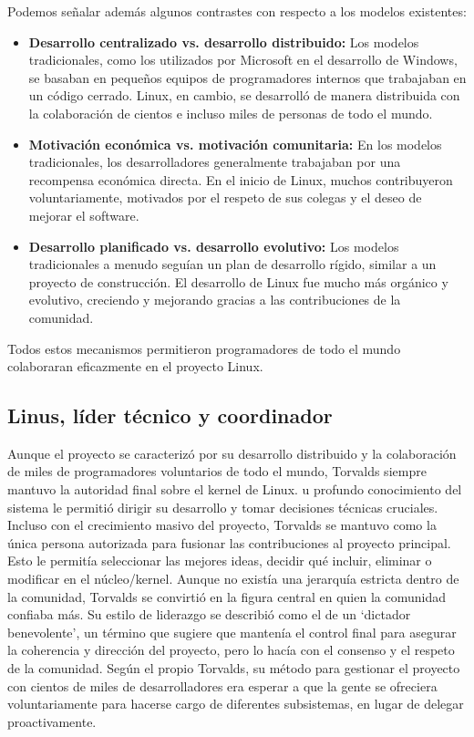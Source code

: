 \documentclass[a4paper,12pt]{article}
\begin{document}
Podemos señalar además algunos contrastes con respecto a los modelos existentes:

\begin{itemize}
    \item \textbf{Desarrollo centralizado vs. desarrollo distribuido:} 
        Los modelos tradicionales, como los utilizados por Microsoft en el
        desarrollo de Windows, se basaban en pequeños equipos de programadores
        internos que trabajaban en un código cerrado. Linux, en cambio, se
        desarrolló de manera distribuida con la colaboración de cientos e
        incluso miles de personas de todo el mundo.
    \item \textbf{Motivación económica vs. motivación comunitaria:}  En los
    modelos tradicionales, los desarrolladores generalmente trabajaban por una
    recompensa económica directa. En el inicio de Linux, muchos contribuyeron
    voluntariamente, motivados por el respeto de sus colegas y el deseo de
    mejorar el software.
    \item \textbf{Desarrollo planificado vs. desarrollo evolutivo:} Los modelos
    tradicionales a menudo seguían un plan de desarrollo rígido, similar a un
    proyecto de construcción. El desarrollo de Linux fue mucho más orgánico y
    evolutivo, creciendo y mejorando gracias a las contribuciones de la comunidad.
\end{itemize}

Todos estos mecanismos permitieron programadores de todo el mundo colaboraran eficazmente en el proyecto Linux.

\subsection{Linus, líder técnico y coordinador}
Aunque el proyecto se caracterizó por su desarrollo distribuido y la
colaboración de miles de programadores voluntarios de todo el mundo, Torvalds
siempre mantuvo la autoridad final sobre el kernel de Linux.
u profundo conocimiento del sistema le permitió dirigir su desarrollo y tomar
decisiones técnicas cruciales. Incluso con el crecimiento masivo del proyecto,
Torvalds se mantuvo como la única persona autorizada para fusionar las
contribuciones al proyecto principal. Esto le permitía seleccionar las mejores
ideas, decidir qué incluir, eliminar o modificar en el núcleo/kernel. 
Aunque no existía una jerarquía estricta dentro de la comunidad, Torvalds se
convirtió en la figura central en quien la comunidad confiaba más. Su estilo de
liderazgo se describió como el de un `dictador benevolente', un término que
sugiere que mantenía el control final para asegurar la coherencia y dirección
del proyecto, pero lo hacía con el consenso y el respeto de la comunidad. Según
el propio Torvalds, su método para gestionar el proyecto con cientos de miles de
desarrolladores era esperar a que la gente se ofreciera voluntariamente para
hacerse cargo de diferentes subsistemas, en lugar de delegar proactivamente.
\end{document}
